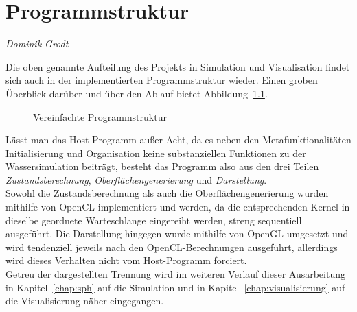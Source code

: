 \chapter{Programmstruktur}
\thispagestyle{empty}

\begin{center}
\emph{{\small Dominik Grodt}}
\end{center}

\bigskip

Die oben genannte Aufteilung des Projekts in Simulation und Visualisation findet sich auch in der implementierten Programmstruktur wieder. Einen groben Überblick darüber und über den Ablauf bietet Abbildung~\ref{fig:programmstruktur}.\\
\begin{figure}
  \centering
    
  \caption{Vereinfachte Programmstruktur}
  \label{fig:programmstruktur}
\end{figure}
Lässt man das Host-Programm außer Acht, da es neben den Metafunktionalitäten Initialisierung und Organisation keine substanziellen Funktionen zu der Wassersimulation beiträgt, besteht das Programm also aus den drei Teilen \textit{Zustandsberechnung}, \textit{Oberflächengenerierung} und \textit{Darstellung}. \\
Sowohl die Zustandsberechnung als auch die Oberflächengenerierung wurden mithilfe von OpenCL implementiert und werden, da die entsprechenden Kernel in dieselbe geordnete Warteschlange eingereiht werden, streng sequentiell ausgeführt. Die Darstellung hingegen wurde mithilfe von OpenGL umgesetzt und wird tendenziell jeweils nach den OpenCL-Berechnungen ausgeführt, allerdings wird dieses Verhalten nicht vom Host-Programm forciert.\\
Getreu der dargestellten Trennung wird im weiteren Verlauf dieser Ausarbeitung in Kapitel~\ref{chap:sph} auf die Simulation und in Kapitel~\ref{chap:visualisierung} auf die Visualisierung näher eingegangen.